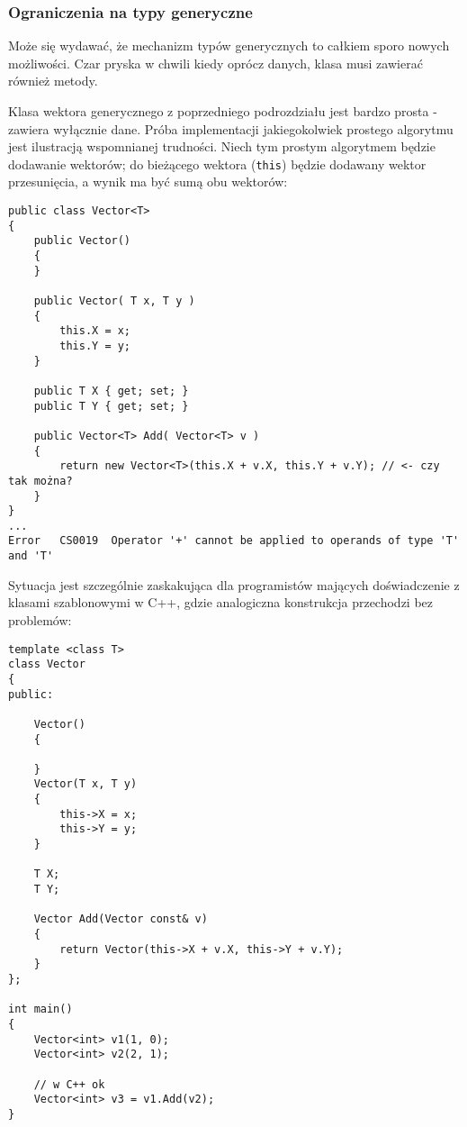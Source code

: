 \subsubsection{Ograniczenia na typy generyczne}

Może się wydawać, że mechanizm typów generycznych to całkiem sporo nowych możliwości. Czar pryska w chwili
kiedy oprócz danych, klasa musi zawierać również metody.

Klasa wektora generycznego z poprzedniego podrozdziału jest bardzo prosta - zawiera wyłącznie dane.
Próba implementacji jakiegokolwiek prostego algorytmu jest ilustracją wspomnianej trudności. Niech tym prostym
algorytmem będzie dodawanie wektorów; do bieżącego wektora ({\tt this}) będzie dodawany wektor przesunięcia, a wynik
ma być sumą obu wektorów:

\begin{scriptsize}
\begin{verbatim}
public class Vector<T>
{
    public Vector()
    {
    }

    public Vector( T x, T y )
    {
        this.X = x;
        this.Y = y;
    }

    public T X { get; set; }
    public T Y { get; set; }

    public Vector<T> Add( Vector<T> v )
    {
        return new Vector<T>(this.X + v.X, this.Y + v.Y); // <- czy tak można?
    }
}
...
Error	CS0019	Operator '+' cannot be applied to operands of type 'T' and 'T'	
\end{verbatim}
\end{scriptsize}

Sytuacja jest szczególnie zaskakująca dla programistów mających doświadczenie z klasami szablonowymi w C++, gdzie
analogiczna konstrukcja przechodzi bez problemów:

\begin{scriptsize}
\begin{verbatim}
template <class T> 
class Vector
{
public:

    Vector()
    {

    }
    Vector(T x, T y)
    {
        this->X = x;
        this->Y = y;
    }

    T X;
    T Y;

    Vector Add(Vector const& v)
    {
        return Vector(this->X + v.X, this->Y + v.Y);
    }
};

int main()
{
    Vector<int> v1(1, 0);
    Vector<int> v2(2, 1);

    // w C++ ok
    Vector<int> v3 = v1.Add(v2);
}
\end{verbatim}
\end{scriptsize}

